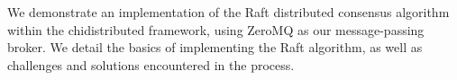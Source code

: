 \documentclass[../main.tex]{subfiles}
\begin{document}
We demonstrate an implementation of the Raft distributed consensus algorithm within the chidistributed framework, using ZeroMQ as our message-passing broker. We detail the basics of implementing the Raft algorithm, as well as challenges and solutions encountered in the process.
\end{document}
